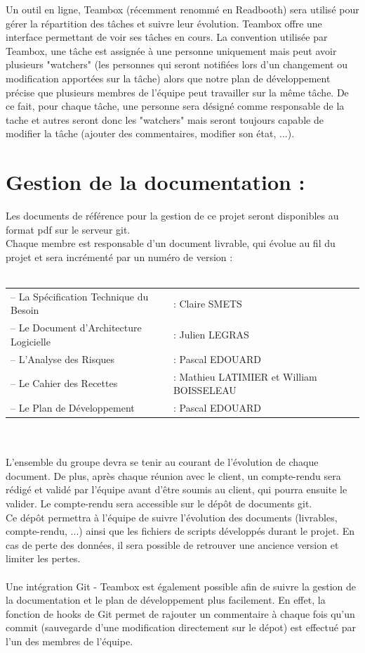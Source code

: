 \documentclass[a4paper,11pt,french]{article}
\begin{document}
\newpage



Un outil en ligne, Teambox (récemment renommé en Readbooth) sera utilisé pour gérer la répartition des tâches et suivre leur évolution. Teambox offre une interface permettant de voir ses tâches en cours. La convention utilisée par Teambox, une tâche est assignée à une personne uniquement mais peut avoir plusieurs "watchers" (les personnes qui seront notifiées lors d'un changement ou modification apportées sur la tâche) alors que notre plan de développement précise que plusieurs membres de l'équipe peut travailler sur la même tâche. De ce fait, pour chaque tâche, une personne sera désigné comme responsable de la tache et autres seront donc les "watchers" mais seront toujours capable de modifier la tâche (ajouter des commentaires, modifier son état, ...).

\section{Gestion de la documentation :}
Les documents de référence pour la gestion de ce projet seront disponibles au format pdf sur le serveur git. \\

Chaque membre est responsable d'un document livrable, qui évolue au fil du projet et sera incrémenté par un numéro de version :\\ \\
\begin{tabular}{ll}
–	La Spécification Technique du Besoin 	& : Claire SMETS\\
–	Le Document d'Architecture Logicielle 	& : Julien LEGRAS\\
–	L'Analyse des Risques 					& : Pascal EDOUARD\\
–	Le Cahier des Recettes 					& : Mathieu LATIMIER et William BOISSELEAU\\
–	Le Plan de Développement 				& : Pascal EDOUARD\\
\end{tabular}
\\ \\

L'ensemble du groupe devra se tenir au courant de l'évolution de chaque document. De plus, après chaque réunion avec le client, un compte-rendu sera rédigé et validé par l'équipe avant d'être soumis au client, qui pourra ensuite le valider. Le compte-rendu sera accessible sur le dépôt de documents git.
\\
Ce dépôt permettra à l'équipe de suivre l'évolution des documents (livrables, compte-rendu, ...) ainsi que les fichiers de scripts développés durant le projet. En cas de perte des données, il sera possible de retrouver une ancience version et limiter les pertes.
\\ \\
Une intégration Git - Teambox est également possible afin de suivre la gestion de la documentation et le plan de développement plus facilement. En effet, la fonction de hooks de Git permet de rajouter un commentaire à chaque fois qu'un commit (sauvegarde d'une modification directement sur le dépot) est effectué par l'un des membres de l'équipe.
\end{document}
